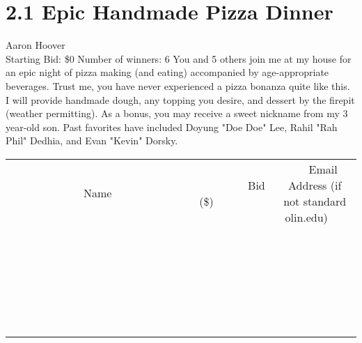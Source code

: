 \documentclass[11pt]{article}
\begin{document}
\section*{2.1 Epic Handmade Pizza Dinner}
Aaron Hoover
\\
Starting Bid: \$0
\newline
Number of winners: 6
\newline
You and 5 others join me at my house for an epic night of pizza making (and eating) accompanied by age-appropriate beverages. Trust me, you have never experienced a pizza bonanza quite like this. I will provide handmade dough, any topping you desire, and dessert by the firepit (weather permitting).  As a bonus, you may receive a sweet nickname from my 3 year-old son. Past favorites have included Doyung "Doe Doe" Lee, Rahil "Rah Phil" Dedhia, and Evan "Kevin" Dorsky.
\\[6ex]
\begin{tabular}{c c c}
~~~~~~~~~~~~~Name~~~~~~~~~~~~~ & ~~~~~~~~~Bid (\$)~~~~~~~~~  & ~~~Email Address (if not standard olin.edu)~~~\\
 & & \\
\hline
 & & \\
\hline
 & & \\
\hline
 & & \\
\hline
 & & \\
\hline
 & & \\
\hline
 & & \\
\hline
 & & \\
\hline
 & & \\
\hline
 & & \\
\hline
 & & \\
\hline
 & & \\
\hline
 & & \\
\hline
 & & \\
\hline
 & & \\
\hline
 & & \\
\hline
 & & \\
\hline
 & & \\
\hline
 & & \\
\hline
 & & \\
\hline
 & & \\
\hline
 & & \\
\hline
 & & \\
\hline
 & & \\
\hline
 & & \\
\hline
 & & \\
\hline
\end{tabular}
\newpage
\end{document}
